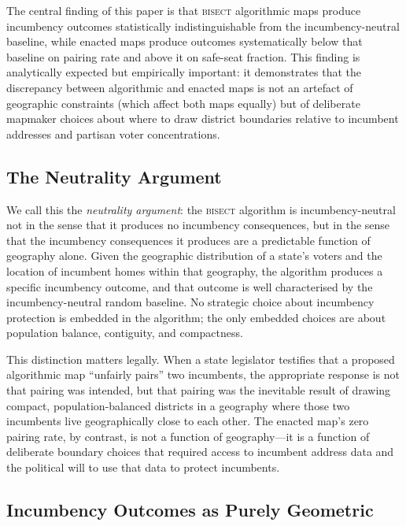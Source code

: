 \label{sec:discussion}

The central finding of this paper is that \textsc{bisect} algorithmic maps produce
incumbency outcomes statistically indistinguishable from the incumbency-neutral baseline,
while enacted maps produce outcomes systematically below that baseline on pairing rate
and above it on safe-seat fraction. This finding is analytically expected but empirically
important: it demonstrates that the discrepancy between algorithmic and enacted maps is
not an artefact of geographic constraints (which affect both maps equally) but of
deliberate mapmaker choices about where to draw district boundaries relative to incumbent
addresses and partisan voter concentrations.

\subsection{The Neutrality Argument}

We call this the \textit{neutrality argument}: the \textsc{bisect} algorithm is
incumbency-neutral not in the sense that it produces no incumbency consequences, but in
the sense that the incumbency consequences it produces are a predictable function of
geography alone. Given the geographic distribution of a state's voters and the location
of incumbent homes within that geography, the algorithm produces a specific incumbency
outcome, and that outcome is well characterised by the incumbency-neutral random baseline.
No strategic choice about incumbency protection is embedded in the algorithm; the only
embedded choices are about population balance, contiguity, and compactness.

This distinction matters legally. When a state legislator testifies that a proposed
algorithmic map ``unfairly pairs'' two incumbents, the appropriate response is not that
pairing was intended, but that pairing was the inevitable result of drawing compact,
population-balanced districts in a geography where those two incumbents live geographically
close to each other. The enacted map's zero pairing rate, by contrast, is not a function
of geography---it is a function of deliberate boundary choices that required access to
incumbent address data and the political will to use that data to protect incumbents.

\subsection{Incumbency Outcomes as Purely Geometric}

